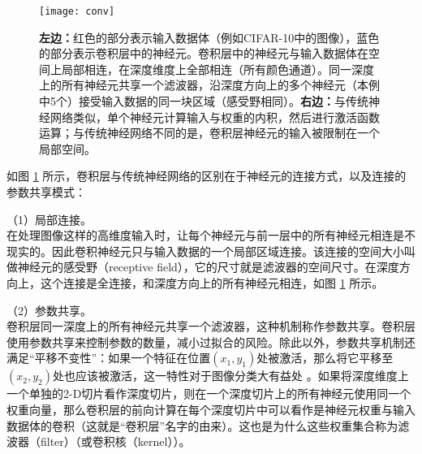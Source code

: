 \begin{figure}[!t]
	\centering
	\texttt{[image: conv]}
	\caption{\textbf{左边：}红色的部分表示输入数据体（例如CIFAR-10中的图像），蓝色的部分表示卷积层中的神经元。卷积层中的神经元与输入数据体在空间上局部相连，在深度维度上全部相连（所有颜色通道）。同一深度上的所有神经元共享一个滤波器，沿深度方向上的多个神经元（本例中5个）接受输入数据的同一块区域（感受野相同）。\textbf{右边：}与传统神经网络类似，单个神经元计算输入与权重的内积，然后进行激活函数运算；与传统神经网络不同的是，卷积层神经元的输入被限制在一个局部空间。}
	\label{conv}
\end{figure}

如图 \ref*{conv} 所示，卷积层与传统神经网络的区别在于神经元的连接方式，以及连接的参数共享模式：
\begin{namelist}{}
	\item （1）局部连接。\\
	在处理图像这样的高维度输入时，让每个神经元与前一层中的所有神经元相连是不现实的。因此卷积神经元只与输入数据的一个局部区域连接。该连接的空间大小叫做神经元的感受野（receptive field），它的尺寸就是滤波器的空间尺寸。在深度方向上，这个连接是全连接，和深度方向上的所有神经元相连，如图 \ref{conv} 所示。
	\item （2）参数共享。\\
	卷积层同一深度上的所有神经元共享一个滤波器，这种机制称作参数共享。卷积层使用参数共享来控制参数的数量，减小过拟合的风险。除此以外，参数共享机制还满足``平移不变性''：如果一个特征在位置$(x_1,y_1)$处被激活，那么将它平移至$(x_2,y_2)$处也应该被激活，这一特性对于图像分类大有益处 \cite{mnist}。如果将深度维度上一个单独的2-D切片看作深度切片，则在一个深度切片上的所有神经元使用同一个权重向量，那么卷积层的前向计算在每个深度切片中可以看作是神经元权重与输入数据体的卷积（这就是``卷积层''名字的由来）。这也是为什么这些权重集合称为滤波器（filter）（或卷积核（kernel））。
\end{namelist}

